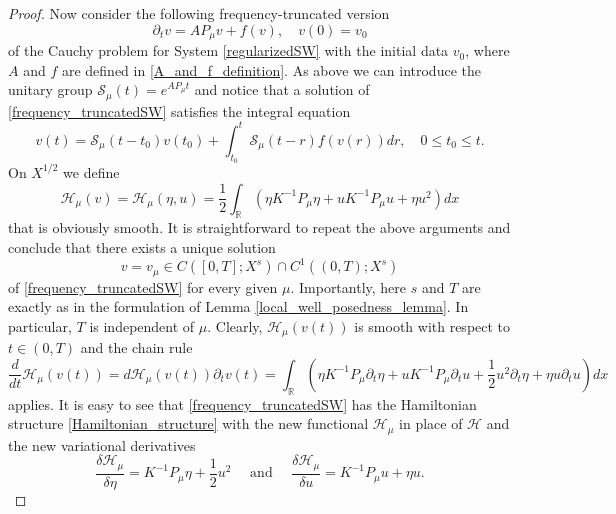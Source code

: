 \documentclass[reqno,12pt,a4paper]{article}
\theoremstyle{plain}
\newcommand{\R}{\mathbb{R}}
\begin{document}
\begin{proof}
Now consider the following frequency-truncated version
\begin{equation}
\label{frequency_truncatedSW}
    \partial_t v = A P_{\mu} v + f(v)
    , \quad
    v(0) = v_0
\end{equation}
of the Cauchy problem for System \eqref{regularizedSW}
with the initial data $v_0$,
where $A$ and $f$ are defined in \eqref{A_and_f_definition}.
As above we can introduce the unitary group
\(
    \mathcal S_{\mu}(t) = e^{A P_{\mu} t}
\)
and notice that a solution of \eqref{frequency_truncatedSW}
satisfies the integral equation
%
\begin{equation}
\label{frequency_truncated_duhamel}
	v(t)
    =
    \mathcal S_{\mu}(t - t_0) v(t_0)
	+
    \int_{t_0}^t \mathcal S_{\mu}(t - r) f(v(r))
	dr
    , \quad
    0 \leqslant t_0 \leqslant t
	.
\end{equation}
%
On $X^{1/2}$ we define
%
\begin{equation*}
	\mathcal H_{\mu}(v)
    =
	\mathcal H_{\mu}(\eta, u)
    =
    \frac 12 \int_\R
	\left(	
		\eta K^{-1} P_{\mu} \eta
		+
        u K^{-1} P_{\mu} u
		+
        \eta u^2
	\right)
	dx
\end{equation*}
%
that is obviously smooth.
It is straightforward to repeat the above arguments and conclude
that there exists a unique solution
\[
    v = v_{\mu}
    \in
    C   \left( [0, T]; X^s \right)
    \cap
    C^1 \left( (0, T); X^s \right)
\]
of \eqref{frequency_truncatedSW} for every given $\mu$.
Importantly,
here $s$ and $T$ are exactly as in the formulation of Lemma \ref{local_well_posedness_lemma}.
In particular, $T$ is independent of $\mu$.
Clearly,
\(
	\mathcal H_{\mu}(v(t))
\)
is smooth with respect to $t \in (0, T)$ and the chain rule
\[
    \frac d{dt}
	\mathcal H_{\mu}(v(t))
    =
    d \mathcal H_{\mu}(v(t))
    \partial_t v(t)
    =
	\int_\R
	\left(
		\eta K^{-1} P_{\mu} \partial_t \eta
		+
        u K^{-1} P_{\mu} \partial_t u
		+
        \frac 12 u^2 \partial_t \eta
        +
        \eta u \partial_t u
	\right)
	dx
\]
applies.
It is easy to see that \eqref{frequency_truncatedSW} has
the Hamiltonian structure \eqref{Hamiltonian_structure}
with the new functional $\mathcal H_{\mu}$ in place of $\mathcal H$
and the new variational derivatives
\begin{equation*}
    \frac{\delta \mathcal H_{\mu}}{\delta \eta}
    =
    K^{-1} P_{\mu} \eta
	+
    \frac 12 u^2
    \quad
    \text{ and }
    \quad
    \frac{\delta \mathcal H_{\mu}}{\delta u}
    =
    K^{-1} P_{\mu} u
    +
    \eta u
    .
\end{equation*}

\end{proof}
\end{document}
